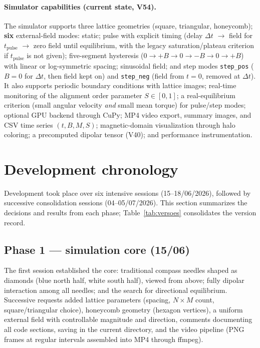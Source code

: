 \documentclass[11pt,a4paper]{article}
\newcommand{\code}[1]{\texttt{#1}}
\begin{document}
\paragraph{Simulator capabilities (current state, V54).}
The simulator supports three lattice geometries (square, triangular, honeycomb); \textbf{six} external-field modes: static; pulse with explicit timing (delay $\Delta t$ $\to$ field for $t_{\mathrm{pulse}}$ $\to$ zero field until equilibrium, with the legacy saturation/plateau criterion if $t_{\mathrm{pulse}}$ is not given); five-segment hysteresis ($0 \to +B \to 0 \to -B \to 0 \to +B$) with linear or log-symmetric spacing; sinusoidal field; and step modes \code{step\_pos} ($B{=}0$ for $\Delta t$, then field kept on) and \code{step\_neg} (field from $t{=}0$, removed at $\Delta t$). It also supports periodic boundary conditions with lattice images; real-time monitoring of the alignment order parameter $S \in [0,1]$; a real-equilibrium criterion (small angular velocity \emph{and} small mean torque) for pulse/step modes; optional GPU backend through CuPy; MP4 video export, summary images, and CSV time series $(t, B, M, S)$; magnetic-domain visualization through halo coloring; a precomputed dipolar tensor (V40); and performance instrumentation.

\section{Development chronology}

Development took place over six intensive sessions (15--18/06/2026), followed by successive consolidation sessions (04--05/07/2026). This section summarizes the decisions and results from each phase; Table~\ref{tab:versoes} consolidates the version record.

\subsection{Phase 1 --- simulation core (15/06)}

The first session established the core: traditional compass needles shaped as diamonds (blue north half, white south half), viewed from above; fully dipolar interaction among all needles; and the search for directional equilibrium. Successive requests added lattice parameters (spacing, $N \times M$ count, square/triangular choice), honeycomb geometry (hexagon vertices), a uniform external field with controllable magnitude and direction, comments documenting all code sections, saving in the current directory, and the video pipeline (PNG frames at regular intervals assembled into MP4 through ffmpeg).
\end{document}
